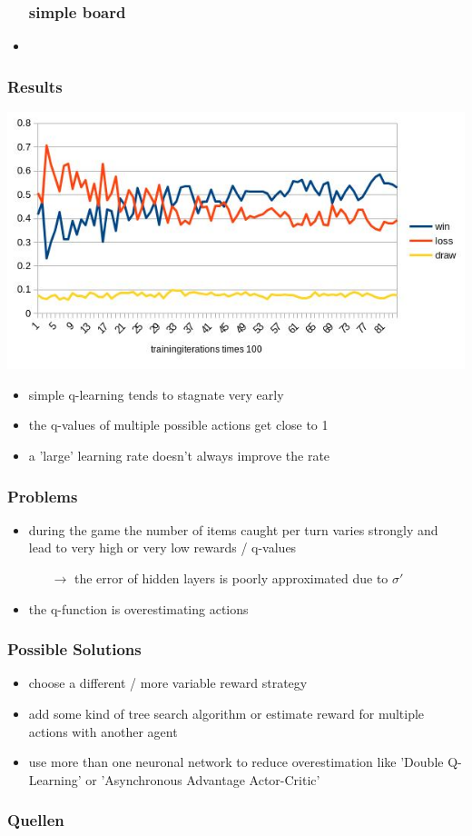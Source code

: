 \documentclass{beamer}
\begin{document}
\begin{frame}
\begin{itemize}
\frametitle{simple board}
\item 
\end{itemize}
\end{frame}

\begin{frame}
\frametitle{Results}
\includegraphics[scale=0.65]{gewinnrate.jpg}
\begin{itemize}
\item simple q-learning tends to stagnate very early
\item the q-values of multiple possible actions get close to 1
\item a 'large' learning rate doesn't always improve the rate 
\end{itemize}
\end{frame}

\begin{frame}
\frametitle{Problems}
\begin{itemize}
\item during the game the number of items caught per turn varies strongly and lead to very high or very low rewards / q-values
\begin{itemize}
\item[$\rightarrow$] the error of hidden layers is poorly approximated due to $\sigma'$
\end{itemize}
\item the q-function is overestimating actions
\end{itemize}
\end{frame}

\begin{frame}
\frametitle{Possible Solutions}
\begin{itemize}
\item choose a different / more variable reward strategy
\item add some kind of tree search algorithm or estimate reward for multiple actions with another agent
\item use more than one neuronal network to reduce overestimation like 'Double Q-Learning' or 'Asynchronous Advantage Actor-Critic' 
\end{itemize}
\end{frame}

\begin{frame}
\frametitle{Quellen}
\end{frame}
\end{document}
